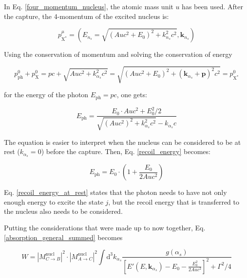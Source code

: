 \documentclass{article}
\begin{document}
In Eq. \ref{four_momentum_nucleus}, the atomic mass unit $u$ has been used.
After the capture, the 4-momentum of the excited nucleus is:

\begin{equation}
	\label{four_momentum_excited_nucleus}
	p^\mu_{\mathrm{X^*}} = \left( E_{n_s} = \sqrt{ \left( Au c^2 + E_0 \right)^2 + k_{n_s}^2 c^2}, \mathbf{k}_{n_s} \right)
\end{equation}

Using the conservation of momentum and solving the conservation of energy

\begin{equation}
	\label{conservation_of_energy}
	p^0_\mathrm{ph} + p^0_\mathrm{X} = p c + \sqrt{ Au c^2 + k_{\alpha_s}^2 c^2} = \sqrt{ \left( Au c^2 + E_0 \right)^2 + (\mathbf{k}_{\alpha_s} + \mathbf{p})^2 c^2} = p^0_\mathrm{X^*}
\end{equation}

for the energy of the photon $E_\mathrm{ph} = pc$, one gets:

\begin{equation}
	\label{recoil_energy}
	E_\mathrm{ph} = \frac{E_0 \cdot Auc^2 + E_0^2/2}{\sqrt{\left( Auc^2\right)^2 + k_{\alpha_s}^2 c^2} - k_{\alpha_s}c}
\end{equation}

The equation is easier to interpret when the nucleus can be considered to be at rest ($k_{\alpha_s} = 0$) before the capture. 
Then, Eq. \ref{recoil_energy} becomes:

\begin{equation}
	\label{recoil_energy_at_rest}
	E_\mathrm{ph} = E_0 \cdot \left( 1 + \frac{E_0}{2 Auc^2} \right)
\end{equation}

Eq. \ref{recoil_energy_at_rest} states that the photon needs to have not only enough energy to excite the state $j$, but the recoil energy that is transferred to the nucleus also needs to be considered.

Putting the considerations that were made up to now together, Eq. \ref{absorption_general_summed} becomes

\begin{equation}
\label{absorption_general_plane_wave}
	W = \left| M^{\mathrm{nucl}}_{C \to B} \right|^2 \cdot \left| M^{\mathrm{nucl}}_{A \to C} \right|^2 \int \mathrm{d}^3 k_{\alpha_s}  \frac{g(\alpha_s)}{ \left[ E' (E, \mathbf{k}_{\alpha_s})- E_0 - \frac{E_0^2}{2 Auc^2} \right]^2 + \Gamma^2 / 4}
\end{equation}
\end{document}

